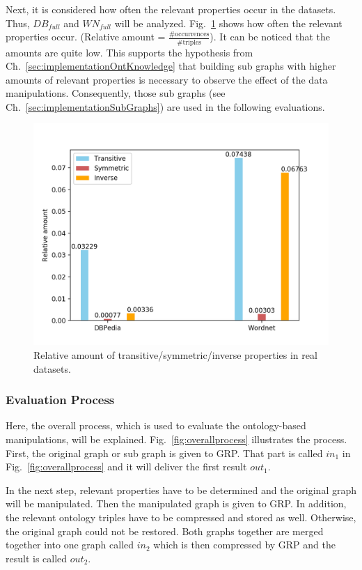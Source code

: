 Next, it is considered how often the relevant properties occur in the datasets.  Thus, $DB_{full}$ and $WN_{full}$ will be analyzed. Fig.~\ref{fig:ontoccurrences} shows how often the relevant properties occur. (Relative amount = $\frac{\text{\#occurrences}}{\text{\#triples}}$). It can be noticed that the amounts are quite low. This supports the hypothesis from Ch.~\ref{sec:implementationOntKnowledge} that building sub graphs with higher amounts of relevant properties is necessary to observe the effect of the data manipulations. Consequently, those sub graphs (see Ch.~\ref{sec:implementationSubGraphs}) are used in the following evaluations.

\begin{figure}
	\centering
	\includegraphics[width=0.9\linewidth]{figures/4_evaluation/ontOccurrences}
	\caption{Relative amount of transitive/symmetric/inverse properties in real datasets.}
	\label{fig:ontoccurrences}
\end{figure}






\subsubsection{Evaluation Process}
Here, the overall process, which is used to evaluate the ontology-based manipulations, will be explained. Fig.~\ref{fig:overallprocess} illustrates the process. First, the original graph or sub graph is given to GRP. That part is called $in_1$ in Fig.~\ref{fig:overallprocess} and it will deliver the first result $out_1$.

In the next step, relevant properties have to be determined and the original graph will be manipulated. Then the manipulated graph is given to GRP. In addition, the relevant ontology triples have to be compressed and stored as well. Otherwise, the original graph could not be restored. Both graphs together are merged together into one graph called $in_2$ which is then compressed by GRP and the result is called $out_2$. 

